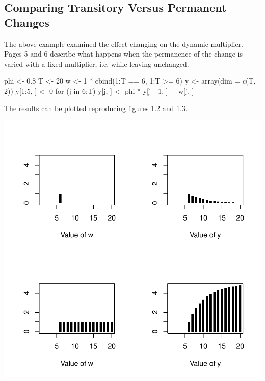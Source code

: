 \documentclass[a4paper]{article}
\renewcommand{\~}{\perispomeni}%
\DeclareRobustCommand{\textgreek}[1]{\leavevmode{\greektext #1}}
\begin{document}
\subsection{Comparing Transitory Versus Permanent Changes}
The above example examined the effect changing
\textgreek{f}
on the dynamic multiplier.  Pages 5 and 6 
describe what happens when the permanence of the change is varied with a fixed multiplier, i.e.
while leaving
\textgreek{f}
unchanged.
\begin{Schunk}
\begin{Sinput}
 phi <- 0.8
 T <- 20
 w <- 1 * cbind(1:T == 6, 1:T >= 6)
 y <- array(dim = c(T, 2))
 y[1:5, ] <- 0
 for (j in 6:T) y[j, ] <- phi * y[j - 1, ] + w[j, ]
\end{Sinput}
\end{Schunk}
The results can be plotted reproducing figures 1.2 and 1.3.
\begin{center}
\includegraphics{Companion-010}
\end{center}
\end{document}
